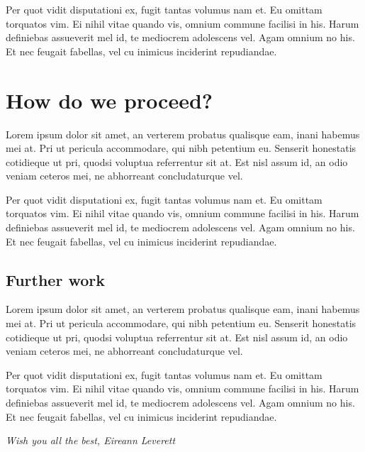 \documentclass[11pt,fleqn]{book} %
\begin{document}
Per quot vidit disputationi ex, fugit tantas volumus nam et. Eu omittam torquatos vim. Ei nihil vitae quando vis, omnium commune facilisi in his. Harum definiebas assueverit mel id, te mediocrem adolescens vel. Agam omnium no his. Et nec feugait fabellas, vel cu inimicus inciderint repudiandae.

\chapter{How do we proceed?}

Lorem ipsum dolor sit amet, an verterem probatus qualisque eam, inani habemus mei at. Pri ut pericula accommodare, qui nibh petentium eu. Senserit honestatis cotidieque ut pri, quodsi voluptua referrentur sit at. Est nisl assum id, an odio veniam ceteros mei, ne abhorreant concludaturque vel.

Per quot vidit disputationi ex, fugit tantas volumus nam et. Eu omittam torquatos vim. Ei nihil vitae quando vis, omnium commune facilisi in his. Harum definiebas assueverit mel id, te mediocrem adolescens vel. Agam omnium no his. Et nec feugait fabellas, vel cu inimicus inciderint repudiandae.

\section{Further work}

Lorem ipsum dolor sit amet, an verterem probatus qualisque eam, inani habemus mei at. Pri ut pericula accommodare, qui nibh petentium eu. Senserit honestatis cotidieque ut pri, quodsi voluptua referrentur sit at. Est nisl assum id, an odio veniam ceteros mei, ne abhorreant concludaturque vel.

Per quot vidit disputationi ex, fugit tantas volumus nam et. Eu omittam torquatos vim. Ei nihil vitae quando vis, omnium commune facilisi in his. Harum definiebas assueverit mel id, te mediocrem adolescens vel. Agam omnium no his. Et nec feugait fabellas, vel cu inimicus inciderint repudiandae.

\vfill
\textit{Wish you all the best, Eireann Leverett}
\end{document}
